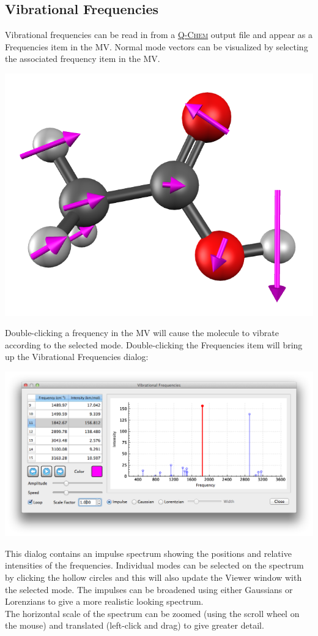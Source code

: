 \documentclass[a4paper,12pt]{article}
\newcommand{\qchem}{\href{http://q-chem.com}{{\scshape Q-Chem}}}
\begin{document}
\newpage
\subsection{Vibrational Frequencies}

Vibrational frequencies can be read in from a \qchem{} output file and appear
as a Frequencies item in the MV.  Normal mode vectors can be visualized by
selecting the associated frequency item in the MV.
\begin{center}
\includegraphics[scale=0.25]{figures/VibMode.png} \\
\end{center}
Double-clicking a frequency in the MV will cause the molecule to vibrate
according to the selected mode.  Double-clicking the Frequencies item will
bring up the Vibrational Frequencies dialog:
\begin{center}
\includegraphics[scale=0.40]{figures/Frequencies.png} \\
\end{center}
This dialog contains an impulse spectrum showing the positions and relative
intensities of the frequencies.  Individual modes can be selected on the
spectrum by clicking the hollow circles and this will also update the Viewer
window with the selected mode.  The impulses can be broadened using either
Gaussians or Lorenzians to give a more realistic looking spectrum. \\

The horizontal scale of the spectrum can be zoomed (using the scroll wheel on
the mouse) and translated (left-click and drag) to give greater detail.




\end{document}
